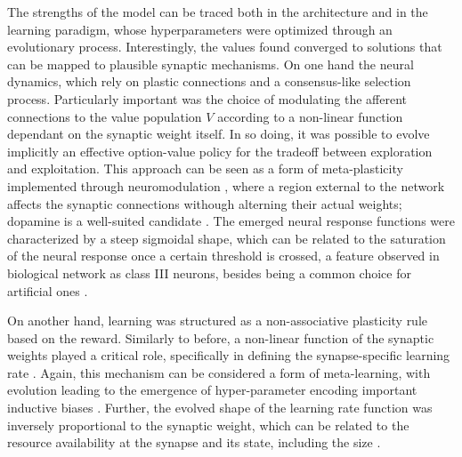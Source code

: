The strengths of the model can be traced both in the architecture and in the learning paradigm, whose hyperparameters were optimized through an evolutionary process. Interestingly, the values found converged to solutions that can be mapped to plausible synaptic mechanisms.
On one hand the neural dynamics, which rely on plastic connections and a consensus-like selection process.
Particularly important was the choice of modulating the afferent connections to the value population $V$ according to a non-linear function dependant on the synaptic weight itself. In so doing, it was possible to evolve implicitly an effective option-value policy for the tradeoff between exploration and exploitation.
This approach can be seen as a form of meta-plasticity implemented through neuromodulation \cite{wangMetalearningNaturalArtificial2021}, where a region external to the network affects the synaptic connections withough alterning their actual weights; dopamine is a well-suited candidate \cite{toblerAdaptiveCodingReward2005, roeschDopamineNeuronsEncode2007, coolsChemistryAdaptiveMind2019}.
The emerged neural response functions were characterized by a steep sigmoidal shape, which can be related to the saturation of the neural response once a certain threshold is crossed, a feature observed in biological network as class III neurons, besides being a common choice for artificial ones \cite{ratteImpactNeuronalProperties2013, ockerFlexibleNeuralConnectivity2020, apicellaSurveyModernTrainable2021}.

On another hand, learning was structured as a non-associative plasticity rule based on the reward. Similarly to before, a non-linear function of the synaptic weights played a critical role, specifically in defining the synapse-specific learning rate \cite{larsenSynapsetypespecificPlasticityLocal2015}.
Again, this mechanism can be considered a form of meta-learning, with evolution leading to the emergence of hyper-parameter encoding important inductive biases \cite{inglisModulationDopamineAdaptive2021, iigayaAdaptiveLearningDecisionmaking2016}. Further, the evolved shape of the learning rate
function was inversely proportional to the synaptic weight, which can be related to the resource availability at the synapse and its state, including the size \cite{blackmanTargetcellspecificShorttermPlasticity2013, bartolHippocampalSpineHead2015, arielIntrinsicVariabilityPv2012}.


